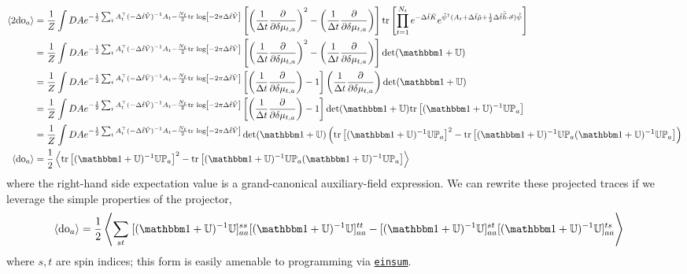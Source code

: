 \begin{align}
    \expectation{2\doubleOccupancy_a}
    &=
    \oneover{Z}\int DA e^{-\frac{1}{2} \sum_t A\transpose_t (-\Delta\tilde{t} \tilde{V})\inverse A_t - \frac{N_t}{2} \trlog{ -2\pi \Delta\tilde{t}\tilde{V}}}
    \left[\left(\oneover{\Delta t}\frac{\partial}{\partial \delta\mu_{t,a}}\right)^2 - \left(\oneover{\Delta t}\frac{\partial}{\partial \delta\mu_{t,a}}\right)\right]\tr{\prod_{t=1}^{N_t} e^{-\Delta \tilde{t}\tilde{K}}  e^{ \tilde{\psi}\adjoint (A_t + \Delta\tilde{t} \tilde{\mu} + \half \Delta\tilde{t} \tilde{\vec{h}}\cdot\vec{\sigma})\tilde{\psi}}}
    \nonumber\\
    &=
    \oneover{Z}\int DA e^{-\frac{1}{2} \sum_t A\transpose_t (-\Delta\tilde{t} \tilde{V})\inverse A_t - \frac{N_t}{2} \trlog{ -2\pi \Delta\tilde{t}\tilde{V}}}
    \left[\left(\oneover{\Delta t}\frac{\partial}{\partial \delta\mu_{t,a}}\right)^2 - \left(\oneover{\Delta t}\frac{\partial}{\partial \delta\mu_{t,a}}\right)\right] \det(\one + \UU)
    \nonumber\\
    &=
    \oneover{Z}\int DA e^{-\frac{1}{2} \sum_t A\transpose_t (-\Delta\tilde{t} \tilde{V})\inverse A_t - \frac{N_t}{2} \trlog{ -2\pi \Delta\tilde{t}\tilde{V}}}
    \left[\left(\oneover{\Delta t}\frac{\partial}{\partial \delta\mu_{t,a}}\right) - 1 \right] \left(\oneover{\Delta t}\frac{\partial}{\partial \delta\mu_{t,a}}\right) \det(\one + \UU)
    \nonumber\\
    &=
    \oneover{Z}\int DA e^{-\frac{1}{2} \sum_t A\transpose_t (-\Delta\tilde{t} \tilde{V})\inverse A_t - \frac{N_t}{2} \trlog{ -2\pi \Delta\tilde{t}\tilde{V}}}
    \left[\left(\oneover{\Delta t}\frac{\partial}{\partial \delta\mu_{t,a}}\right) - 1 \right] \det(\one + \UU) \tr{(\one + \UU)\inverse \UU \PP_a}
    \nonumber\\
    &=
    \oneover{Z}\int DA e^{-\frac{1}{2} \sum_t A\transpose_t (-\Delta\tilde{t} \tilde{V})\inverse A_t - \frac{N_t}{2} \trlog{ -2\pi \Delta\tilde{t}\tilde{V}}}
    \det( \one+\UU ) \left(\tr{(\one + \UU)\inverse \UU \PP_a}^2 - \tr{(\one+\UU)\inverse \UU \PP_a (\one+\UU)\inverse \UU \PP_a}\right)
    \nonumber\\
    \expectation{\doubleOccupancy_a}
    &=
    \half\expectation{\tr{(\one + \UU)\inverse \UU \PP_a}^2 - \tr{(\one+\UU)\inverse \UU \PP_a (\one+\UU)\inverse \UU \PP_a}}
    \label{eq:double occupancy}
\end{align}
where the right-hand side expectation value is a grand-canonical auxiliary-field expression.
We can rewrite these projected traces if we leverage the simple properties of the projector,
\begin{align}
    \expectation{\doubleOccupancy_a}
    &=
    \half\expectation{\sum_{st}\; [(\one + \UU)\inverse \UU]_{aa}^{ss} [(\one + \UU)\inverse \UU]_{aa}^{tt} - [(\one + \UU)\inverse \UU]_{aa}^{st} [(\one + \UU)\inverse \UU]_{aa}^{ts} }
\end{align}
where $s,t$ are spin indices; this form is easily amenable to programming via \href{https://pytorch.org/docs/stable/generated/torch.einsum.html}{\texttt{einsum}}.


